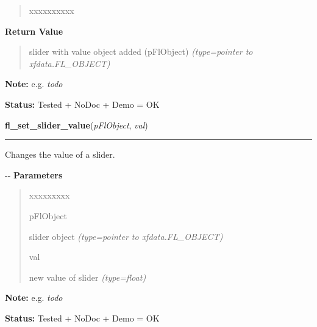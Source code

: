 \begin{boxedminipage}{\funcwidth}
\begin{quote}
\begin{Ventry}{xxxxxxxxxx}
        \end{Ventry}

      \end{quote}

      \textbf{Return Value}
    \vspace{-1ex}

      \begin{quote}

slider with value object added (pFlObject)
      {\it (type=pointer to xfdata.FL\_OBJECT)}

      \end{quote}

\textbf{Note:} 
e.g. \emph{todo}


\textbf{Status:} 
Tested + NoDoc + Demo = OK


    \end{boxedminipage}

    \label{xformslib:flslider:fl_set_slider_value}

    \vspace{0.5ex}

\hspace{.8\funcindent}\begin{boxedminipage}{\funcwidth}

    \raggedright \textbf{fl\_set\_slider\_value}(\textit{pFlObject}, \textit{val})

    \vspace{-1.5ex}

    \rule{\textwidth}{0.5\fboxrule}
\setlength{\parskip}{2ex}

Changes the value of a slider.

-{}-
\setlength{\parskip}{1ex}
      \textbf{Parameters}
      \vspace{-1ex}

      \begin{quote}
        \begin{Ventry}{xxxxxxxxx}

          \item[pFlObject]


slider object
            {\it (type=pointer to xfdata.FL\_OBJECT)}

          \item[val]


new value of slider
            {\it (type=float)}

        \end{Ventry}

      \end{quote}

\textbf{Note:} 
e.g. \emph{todo}


\textbf{Status:} 
Tested + NoDoc + Demo = OK


    \end{boxedminipage}

